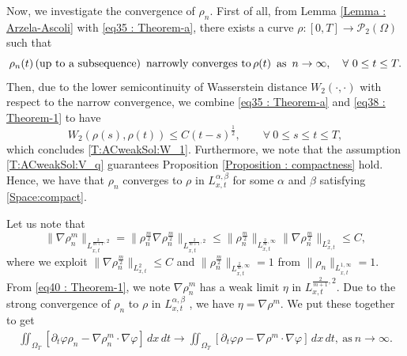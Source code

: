 \documentclass{amsart}
\numberwithin{equation}{section}
\begin{document}
Now, we investigate the convergence of $\rho_n$. First of all, from Lemma \ref{Lemma : Arzela-Ascoli} with \eqref{eq35 : Theorem-a}, there exists a curve $\rho : [0, T] \rightarrow \mathcal{P}_2(\Omega)$ such that
\begin{equation}\label{eq38 : Theorem-1}
\rho_n(t) \,\mbox{(up to a subsequence) \,narrowly converges to}\, \rho(t) \,~\mbox{as}~ \, n \rightarrow \infty, \quad \forall \ 0\leq t \leq T.
\end{equation}
Then,
due to the lower semicontinuity of Wasserstein distance $W_{2}(\cdot, \cdot)$ with respect to the narrow convergence, we combine \eqref{eq35 : Theorem-a} and \eqref{eq38 : Theorem-1} to have
\begin{equation*}\label{eq37 : Theorem-1}
 W_{2}(\rho(s),\rho(t)) \leq   C (t-s)^{\frac{1}{2}},
\qquad \forall ~ 0\leq s\leq t\leq T,
\end{equation*}
which concludes \eqref{T:ACweakSol:W_1}.
%
Furthermore, we note that the assumption \eqref{T:ACweakSol:V_q} guarantees Proposition \ref{Proposition : compactness} hold. Hence, we have that $\rho_n$ converges to $\rho$ in $ L_{x,t}^{\alpha, \beta}$ for some $\alpha$ and $\beta$ satisfying \eqref{Space:compact}. 

Let us note that 
\begin{equation}\label{eq40 : Theorem-1}
\|\nabla \rho_n^m \|_{L_{x,t}^{\frac{2}{m+1},2}} = \|\rho_n^{\frac{m}{2}} \nabla \rho_n^{\frac{m}{2}} \|_{L_{x,t}^{\frac{2}{m+1},2}} 
\leq \|\rho_n^{\frac{m}{2}}  \|_{L_{x,t}^{\frac{2}{m},\infty}} \| \nabla \rho_n^{\frac{m}{2}} \|_{L_{x,t}^{2}}  \leq C,
\end{equation}
where we exploit $ \| \nabla \rho_n^{\frac{m}{2}} \|_{L_{x,t}^{2}}  \leq C$  and  $\|\rho_n^{\frac{m}{2}} \|_{L_{x,t}^{\frac{2}{m},\infty}}=1$ from $\|\rho_n \|_{L_{x,t}^{1,\infty}} =1$.  
From \eqref{eq40 : Theorem-1}, we note $ \nabla \rho_n^m$ has a weak limit $\eta$ in $L_{x,t}^{\frac{2}{m+1},2}$. Due to the strong convergence of $\rho_n$ to $\rho$ in $ L_{x,t}^{\alpha, \beta}$ 
 , we have
$\eta= \nabla \rho^m$. We put these together to get
\begin{equation}\label{eq3 : Theorem-1}
\begin{aligned}
\iint_{\Omega_T}  \left[\partial_t\varphi \rho_n  -\nabla \rho_n^m  \cdot \nabla \varphi\right ] \,dx\,dt \longrightarrow
\iint_{\Omega_T}  \left[\partial_t\varphi \rho  - \nabla  \rho^m \cdot \nabla \varphi\right ] \,dx\,dt, ~\mbox{as} \ n\rightarrow \infty.
\end{aligned}
\end{equation}
\end{document}
